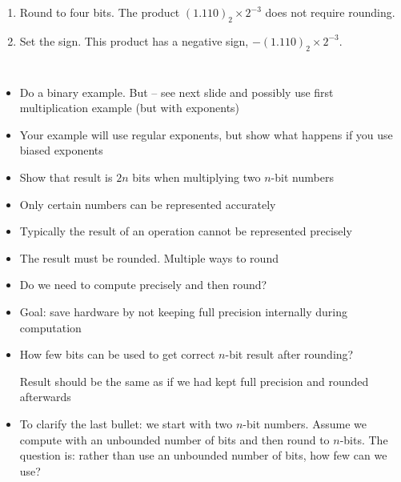 \begin{frame}[fragile]
\begin{columns}
{\begin{enumerate}
\item Round to four bits. The product $(1.110)_2 \times 2^{-3}$ does not require rounding.
\item Set the sign. This product has a negative sign, $-(1.110)_2 \times 2^{-3}$.
\end{enumerate}
    }
\end{columns}

	

\BNotes\ifnum{}
\begin{itemize}
\item Do a binary example.  But -- see next slide and possibly use first
	multiplication example (but with exponents)
\item Your example will use regular exponents, but show what happens
	if you use biased exponents
\item Show that result is $2n$ bits when multiplying two $n$-bit numbers
\end{itemize}
\fi\ENotes
\end{frame}

\begin{frame}[fragile]
\begin{itemize}
        \item Only certain numbers can be represented accurately
	\item Typically the result of an operation cannot be represented precisely
	\item The result must be rounded.  Multiple ways to round

	\item Do we need to compute precisely and then round?
        \item Goal: save hardware by not keeping full precision internally during computation

	\item	How few bits can be used to get correct $n$-bit result after
		rounding?

	Result should be the same as if we had kept full precision and 
		rounded afterwards
\end{itemize}
\BNotes\ifnum{}
\begin{itemize}
	\item To clarify the last bullet: we start with two $n$-bit numbers.
		Assume we compute with an unbounded number of bits and
		then round to $n$-bits.  The question is: rather than use
		an unbounded number of bits, how few can we use?
\end{itemize}
\fi\ENotes
\end{frame}

